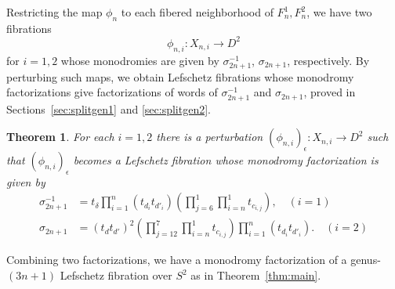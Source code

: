 \documentclass[10pt,a4paper,reqno]{amsart}
\newtheorem{thm}{Theorem}[section]
\theoremstyle{definition}
\numberwithin{equation}{section}
\numberwithin{figure}{section}
\newcommand{\ep}{\epsilon}
\newcommand{\arrowr}{\rightarrow}
\begin{document}
Restricting the map $\phi_{n}$ to each fibered neighborhood of $F_{n}^1, F_{n}^2$, 
we have two fibrations \[\phi_{n,i}: X_{n,i}\arrowr D^2\] for $i=1,2$ 
whose monodromies are given by $\sigma_{2n+1}^{-1}$, $\sigma_{2n+1}$, respectively.
By perturbing such maps, 
we obtain Lefschetz fibrations whose monodromy factorizations give factorizations of words of $\sigma_{2n+1}^{-1}$ and $\sigma_{2n+1}$, proved in Sections~\ref{sec:splitgen1} and \ref{sec:splitgen2}.

\begin{thm}\label{thm3}
For each $i=1,2$ there is a perturbation $(\phi_{n,i})_\ep :X_{n,i} \arrowr D^2$ such that $(\phi_{n,i})_\ep$ becomes a Lefschetz fibration whose monodromy factorization is given by
\begin{align}
\sigma_{2n+1}^{-1}&=t_{\delta}\prod_{i=1}^n (t_{d_i} t_{d'_i}) \left(\prod_{j=6}^1 \prod_{i=n}^1 t_{c_{i,j}} \right), \quad (i=1) \label{eq:genfact_1}\\
\sigma_{2n+1}&= (t_{d} t_{d'})^2 \left(\prod_{j=12}^7 \prod_{i=n}^1 t_{c_{i,j}} \right) \prod_{i=1}^n (t_{d_i} t_{d'_i}). \quad (i=2) \label{eq:genfact_2}
\end{align}
\end{thm}

Combining two factorizations, we have a monodromy factorization of a genus-$(3n+1)$ Lefschetz fibration over $S^2$ as in Theorem~\ref{thm:main}.

%
%
%
\end{document}
